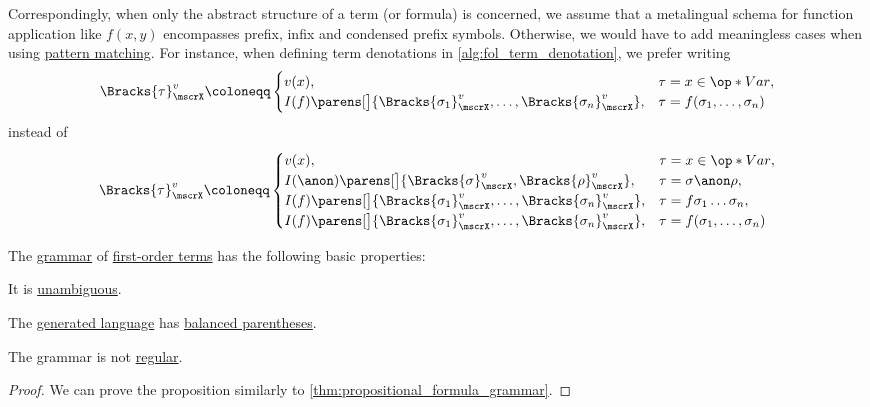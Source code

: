 \begin{remark}
  Correspondingly, when only the abstract structure of a term (or formula) is concerned, we assume that a metalingual schema for function application like \( f(x, y) \) encompasses prefix, infix and condensed prefix symbols. Otherwise, we would have to add meaningless cases when using \hyperref[con:evaluation]{pattern matching}. For instance, when defining term denotations in \cref{alg:fol_term_denotation}, we prefer writing
  \begin{equation*}
    \Bracks{\tau}_\mscrX^v \coloneqq \begin{cases}
      v(x),                                                                                &\tau = x \in \op*{Var}, \\
      I(f)\parens[\big]{ \Bracks{\sigma_1}_\mscrX^v, \ldots, \Bracks{\sigma_n}_\mscrX^v }, &\tau = f(\sigma_1, \ldots, \sigma_n)
    \end{cases}
  \end{equation*}
  instead of
  \begin{equation*}
    \Bracks{\tau}_\mscrX^v \coloneqq \begin{cases}
      v(x),                                                                             &\tau = x \in \op*{Var}, \\
      I(\anon)\parens[\big]{ \Bracks{\sigma}_\mscrX^v, \Bracks{\rho}_\mscrX^v },           &\tau = \sigma \anon \rho, \\
      I(f)\parens[\big]{ \Bracks{\sigma_1}_\mscrX^v, \ldots, \Bracks{\sigma_n}_\mscrX^v }, &\tau = f \sigma_1 \ldots \sigma_n, \\
      I(f)\parens[\big]{ \Bracks{\sigma_1}_\mscrX^v, \ldots, \Bracks{\sigma_n}_\mscrX^v }, &\tau = f(\sigma_1, \ldots, \sigma_n)
    \end{cases}
  \end{equation*}
\end{remark}

\begin{proposition}\label{thm:fol_term_grammar}
  The \hyperref[def:formal_grammar]{grammar} of \hyperref[def:fol_term]{first-order terms} has the following basic properties:
  \begin{thmenum}
     It is \hyperref[def:grammar_ambiguity]{unambiguous}.

     The \hyperref[def:formal_grammar/language]{generated language} has \hyperref[def:paired_delimiters]{balanced parentheses}.

     The grammar is not \hyperref[def:chomsky_hierarchy/regular]{regular}.
  \end{thmenum}
\end{proposition}
\begin{proof}
  We can prove the proposition similarly to \cref{thm:propositional_formula_grammar}.
\end{proof}

